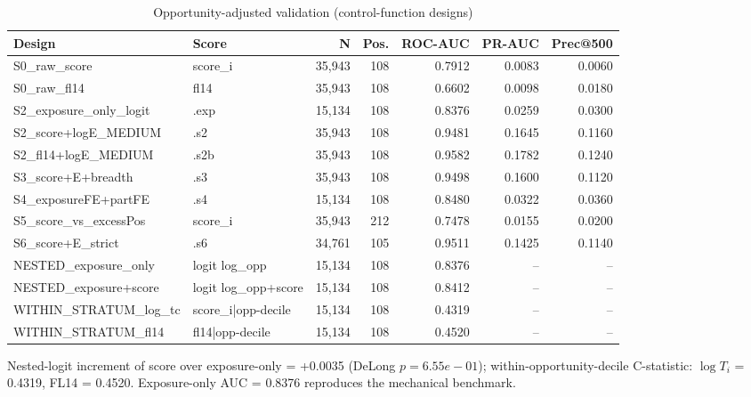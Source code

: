 \begin{table}[htbp]\centering
\caption{Opportunity-adjusted validation (control-function designs)}
\label{tab:opp_adjusted_validation}
\begin{tabular}{llrrrrr}\hline
Design & Score & N & Pos. & ROC-AUC & PR-AUC & Prec@500 \\\hline
S0\_raw\_score & score\_i & 35,943 & 108 & 0.7912 & 0.0083 & 0.0060 \\
S0\_raw\_fl14 & fl14 & 35,943 & 108 & 0.6602 & 0.0098 & 0.0180 \\
S2\_exposure\_only\_logit & .exp & 15,134 & 108 & 0.8376 & 0.0259 & 0.0300 \\
S2\_score+logE\_MEDIUM & .s2 & 35,943 & 108 & 0.9481 & 0.1645 & 0.1160 \\
S2\_fl14+logE\_MEDIUM & .s2b & 35,943 & 108 & 0.9582 & 0.1782 & 0.1240 \\
S3\_score+E+breadth & .s3 & 35,943 & 108 & 0.9498 & 0.1600 & 0.1120 \\
S4\_exposureFE+partFE & .s4 & 15,134 & 108 & 0.8480 & 0.0322 & 0.0360 \\
S5\_score\_vs\_excessPos & score\_i & 35,943 & 212 & 0.7478 & 0.0155 & 0.0200 \\
S6\_score+E\_strict & .s6 & 34,761 & 105 & 0.9511 & 0.1425 & 0.1140 \\
NESTED\_exposure\_only & logit log\_opp & 15,134 & 108 & 0.8376 & -- & -- \\
NESTED\_exposure+score & logit log\_opp+score & 15,134 & 108 & 0.8412 & -- & -- \\
WITHIN\_STRATUM\_log\_tc & score\_i|opp-decile & 15,134 & 108 & 0.4319 & -- & -- \\
WITHIN\_STRATUM\_fl14 & fl14|opp-decile & 15,134 & 108 & 0.4520 & -- & -- \\
\hline\end{tabular}
\begin{tablenotes}\footnotesize\item Nested-logit increment of score over exposure-only = +0.0035 (DeLong $p=6.55e-01$); within-opportunity-decile C-statistic: $\log T_i$ = 0.4319, FL14 = 0.4520. Exposure-only AUC = 0.8376 reproduces the mechanical benchmark.\end{tablenotes}
\end{table}
